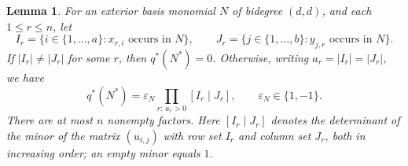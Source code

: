 \documentclass[10pt]{amsart}
\newtheorem{lemma}[theorem]{Lemma}
\theoremstyle{definition}
\theoremstyle{remark}
\begin{document}
\begin{lemma}
\label{lem:allcoords}
For an exterior basis monomial $N$ of bidegree $(d,d)$, and each
$1\leq r\leq n$, let
\[
 I_r=\{i\in\{1,\ldots,a\}:x_{r,i}\text{ occurs in }N\},\qquad
 J_r=\{j\in\{1,\ldots,b\}:y_{j,r}\text{ occurs in }N\}.
\]
If $|I_r|\ne|J_r|$ for some $r$, then $q^*(N^*)=0$.
Otherwise, writing $a_r=|I_r|=|J_r|$, we have
\begin{equation}\label{eq:allcoords}
 q^*(N^*)=\varepsilon_N\prod_{r:\,a_r>0}[I_r\mid J_r],
 \qquad\varepsilon_N\in\{1,-1\}.
\end{equation}
There are at most $n$ nonempty factors. Here $[I_r\mid J_r]$
denotes the determinant of the minor of the matrix  $( u_{i,j})$ with row set $I_r$ and column set $J_r$,
both in increasing order; an empty minor equals $1$.
\end{lemma}
\end{document}
